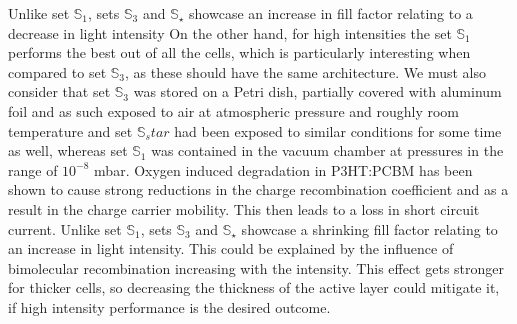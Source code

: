\documentclass[a4paper,10pt,twocolumn]{article}
\begin{document}
\begin{extract*}
Unlike set $\mathbb{S}_1$, sets $\mathbb{S}_3$ and $\mathbb{S}_\star$ showcase an increase in fill factor relating to a decrease in light intensity
On the other hand, for high intensities the set $\mathbb{S}_1$ performs the best out of all the cells, which is particularly interesting when compared to set $\mathbb{S}_3$, as these should have the same architecture. We must also consider that set $\mathbb{S}_3$ was stored on a Petri dish, partially covered with aluminum foil and as such exposed to air at atmospheric pressure and roughly room temperature and set $\mathbb{S}_star$ had been exposed to similar conditions for some time as well, whereas set $\mathbb{S}_1$ was contained in the vacuum chamber at pressures in the range of $10^{-8}$ mbar. Oxygen induced degradation in P3HT:PCBM has been shown\cite{source14} to cause strong reductions in the charge recombination coefficient and as a result in the charge carrier mobility. This then leads to a loss in short circuit current.\mypar
Unlike set $\mathbb{S}_1$, sets $\mathbb{S}_3$ and $\mathbb{S}_\star$ showcase a shrinking fill factor relating to an increase in light intensity. This could be explained by the influence of bimolecular recombination increasing with the intensity\cite{source15}. This effect gets stronger for thicker cells, so decreasing the thickness of the active layer could mitigate it, if high intensity performance is the desired outcome.



\end{extract*}
\end{document}
